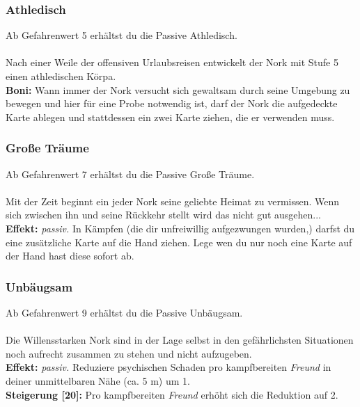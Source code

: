 \subsubsection*{ Athledisch} \label{sk:athledisch}
Ab Gefahrenwert 5 erhältst du die Passive Athledisch.\\
\\
Nach einer Weile der offensiven Urlaubsreisen entwickelt der Nork mit Stufe 5 einen athledischen Körpa.\\
\textbf{Boni:} Wann immer der Nork versucht sich gewaltsam durch seine Umgebung zu bewegen und hier für eine Probe notwendig ist, darf der Nork die aufgedeckte Karte ablegen und stattdessen ein zwei Karte ziehen, die er verwenden muss.

\subsubsection*{ Große Träume} \label{sk:große_Träume}
Ab Gefahrenwert 7 erhältst du die Passive Große Träume.\\
\\
Mit der Zeit beginnt ein jeder Nork seine geliebte Heimat zu vermissen. Wenn sich zwischen ihn und seine Rückkehr stellt wird das nicht gut ausgehen...\\
\textbf{Effekt:} \textit{passiv.} In Kämpfen (die dir unfreiwillig aufgezwungen wurden,) darfst du eine zusätzliche Karte auf die Hand ziehen. Lege wen du nur noch eine Karte auf der Hand hast diese sofort ab.

\subsubsection*{ Unbäugsam} \label{sk:unbäugsam}
Ab Gefahrenwert 9 erhältst du die Passive Unbäugsam.\\
\\
Die Willensstarken Nork sind in der Lage selbst in den gefährlichsten Situationen noch aufrecht zusammen zu stehen und nicht aufzugeben.\\
\textbf{Effekt:} \textit{passiv.} Reduziere psychischen Schaden pro kampfbereiten \textit{Freund} in deiner unmittelbaren Nähe (ca. 5 m) um 1.\\
\textbf{Steigerung [20]:} Pro kampfbereiten \textit{Freund} erhöht sich die Reduktion auf 2.

